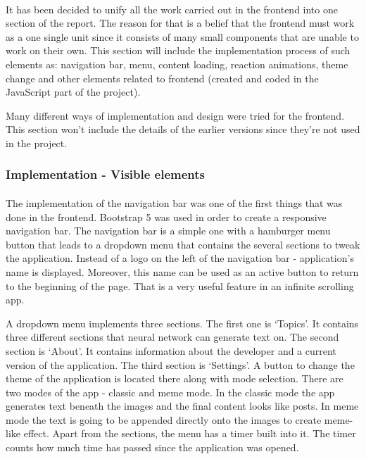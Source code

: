 \documentclass[12pt]{report}
\begin{document}
\paragraph{}
It has been decided to unify all the work carried out in the frontend into one section of the report. The reason for that
is a belief that the frontend must work as a one single unit since it consists of many small components that are unable to
work on their own. This section will include the implementation process of such elements as: navigation bar, menu,
content loading, reaction animations, theme change and other elements related to frontend (created and coded in the
JavaScript part of the project).

Many different ways of implementation and design were tried for the frontend. This section won't include the details of
the earlier versions since they're not used in the project.

\subsubsection*{Implementation - Visible elements}
\paragraph{}
The implementation of the navigation bar was one of the first things that was done in the frontend. Bootstrap 5 was used
in order to create a responsive navigation bar. The navigation bar is a simple one with a hamburger menu button that leads
to a dropdown menu that contains the several sections to tweak the application. Instead of a logo on the left of the navigation
bar - application's name is displayed. Moreover, this name can be used as an active button to return to the beginning of the page.
That is a very useful feature in an infinite scrolling app.

A dropdown menu implements three sections. The first one is `Topics'. It contains three different sections that neural network
can generate text on. The second section is `About'. It contains information about the developer and a current version of the
application. The third section is `Settings'. A button to change the theme of the application is located there along with
mode selection. There are two modes of the app - classic and meme mode. In the classic mode the app generates text beneath
the images and the final content looks like posts. In meme mode the text is going to be appended directly onto the images to create
meme-like effect. Apart from the sections, the menu has a timer built into it. The timer counts how much time has passed since the
application was opened.
\end{document}
